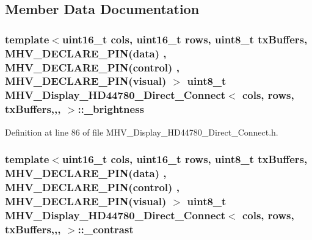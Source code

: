 \subsection{Member Data Documentation}
\hypertarget{class_m_h_v___display___h_d44780___direct___connect_a28772cbdf99b334dede742f6e65ef887}{
\subsubsection[{\-\_\-brightness}]{\setlength{\rightskip}{0pt plus 5cm}template$<$uint16\-\_\-t cols, uint16\-\_\-t rows, uint8\-\_\-t tx\-Buffers, M\-H\-V\-\_\-\-D\-E\-C\-L\-A\-R\-E\-\_\-\-P\-I\-N(data) , M\-H\-V\-\_\-\-D\-E\-C\-L\-A\-R\-E\-\_\-\-P\-I\-N(control) , M\-H\-V\-\_\-\-D\-E\-C\-L\-A\-R\-E\-\_\-\-P\-I\-N(visual) $>$ uint8\-\_\-t {\bf M\-H\-V\-\_\-\-Display\-\_\-\-H\-D44780\-\_\-\-Direct\-\_\-\-Connect}$<$ cols, rows, tx\-Buffers,,, $>$\-::\-\_\-brightness\hspace{0.3cm}{\ttfamily [protected]}}}\label{class_m_h_v___display___h_d44780___direct___connect_a28772cbdf99b334dede742f6e65ef887}


Definition at line 86 of file M\-H\-V\-\_\-\-Display\-\_\-\-H\-D44780\-\_\-\-Direct\-\_\-\-Connect.\-h.

\hypertarget{class_m_h_v___display___h_d44780___direct___connect_a1f11cb05bdb7d100c222f3695703fda6}{
\subsubsection[{\-\_\-contrast}]{\setlength{\rightskip}{0pt plus 5cm}template$<$uint16\-\_\-t cols, uint16\-\_\-t rows, uint8\-\_\-t tx\-Buffers, M\-H\-V\-\_\-\-D\-E\-C\-L\-A\-R\-E\-\_\-\-P\-I\-N(data) , M\-H\-V\-\_\-\-D\-E\-C\-L\-A\-R\-E\-\_\-\-P\-I\-N(control) , M\-H\-V\-\_\-\-D\-E\-C\-L\-A\-R\-E\-\_\-\-P\-I\-N(visual) $>$ uint8\-\_\-t {\bf M\-H\-V\-\_\-\-Display\-\_\-\-H\-D44780\-\_\-\-Direct\-\_\-\-Connect}$<$ cols, rows, tx\-Buffers,,, $>$\-::\-\_\-contrast\hspace{0.3cm}{\ttfamily [protected]}}}\label{class_m_h_v___display___h_d44780___direct___connect_a1f11cb05bdb7d100c222f3695703fda6}


